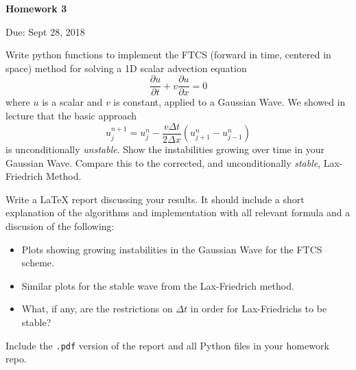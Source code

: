\documentclass{article}
\begin{document}
\begin{center}

\vspace*{-2.5cm}
\LARGE
\bf{Homework 3}
\vspace{1cm}

\large{Due: Sept 28, 2018}
\vspace{1cm}

\end{center}

Write python functions to implement the FTCS (forward in time, centered in space) method for solving a 1D scalar advection equation
\begin{equation*}
   \frac{\partial u}{\partial t} + v \frac{\partial u}{\partial x} = 0
\end{equation*}
where $u$ is a scalar and $v$ is constant, applied to a Gaussian Wave. We showed in lecture that the basic approach
\begin{equation*}
   u_j^{n+1} = u^n_j - \frac{v \Delta t}{2\Delta x} \left( u^n_{j+1} - u^n_{j-1} \right) 
\end{equation*}
is unconditionally \emph{unstable}.  Show the instabilities growing over time in your Gaussian Wave.  Compare this to the corrected, and unconditionally \emph{stable}, Lax-Friedrich Method.
\par
Write a \LaTeX{} report discussing your results.  It should include a short explanation of the algorithms and implementation with all relevant formula and a discusion of the following:
\begin{itemize}
   \item Plots showing growing instabilities in the Gaussian Wave for the FTCS scheme.
   \item Similar plots for the stable wave from the Lax-Friedrich method.
   \item What, if any, are the restrictions on $\Delta t$ in order for Lax-Friedrichs to be stable?
\end{itemize}
Include the \texttt{.pdf} version of the report and all Python files in your homework repo.
\end{document}
